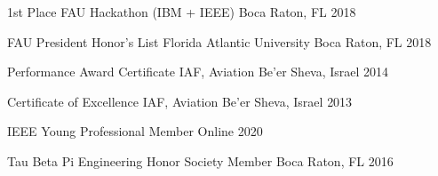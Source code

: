 




\begin{cvhonors}


\cvhonor
{1st Place} %
{FAU Hackathon (IBM + IEEE)} %
{Boca Raton, FL} %
{2018} %


\cvhonor
{FAU President Honor's List} %
{Florida Atlantic University} %
{Boca Raton, FL} %
{2018} %


\cvhonor
{Performance Award Certificate} %
{IAF, Aviation} %
{Be'er Sheva, Israel} %
{2014} %


\cvhonor
{Certificate of Excellence} %
{IAF, Aviation} %
{Be'er Sheva, Israel} %
{2013} %


\end{cvhonors}



\begin{cvhonors}

\cvhonor
{IEEE Young Professional} %
{Member} %
{Online} %
{2020} %



\cvhonor
{Tau Beta Pi Engineering Honor Society} %
{Member} %
{Boca Raton, FL} %
{2016} %


	
\end{cvhonors}